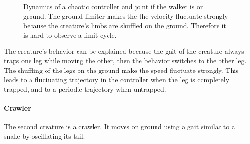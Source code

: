 \documentclass[main]{subfiles}
\begin{document}
\begin{figure}[H]
\centering
	\begin{minipage}{1.3\textwidth}
	\hspace*{-5em}
	\end{minipage}
\caption[On ground controller dynamics of the walker]{Dynamics of a chaotic controller and joint if the walker is on ground. The ground limiter makes the the velocity fluctuate strongly because the creature's limbs are shuffled on the ground. Therefore it is hard to observe a limit cycle.}
\label{figure:walker1-on-ground-controller-dynamics}
\end{figure}

The creature's behavior can be explained because the gait of the creature always traps one leg while moving the other, then the behavior switches to the other leg. %
%
The shuffling of the legs on the ground make the speed fluctuate strongly. %
%
This leads to a fluctuating trajectory in the controller when the leg is completely trapped, and to a periodic trajectory when untrapped. %

\paragraph{Crawler}

The second creature is a crawler. It moves on ground using a gait similar to a snake by oscillating its tail.
\end{document}
